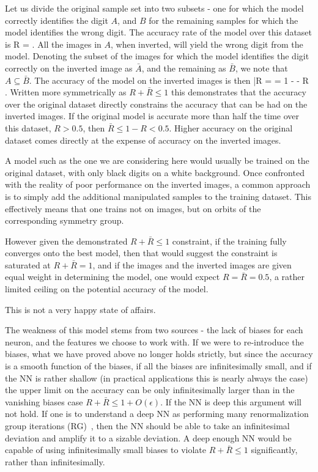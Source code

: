 \documentclass[onecolumn, nofootinbib, aps, pra, 11pt]{revtex4-1}
\begin{document}
Let us divide the original sample set into two subsets - one for which the model correctly identifies the digit $A$, and $B$ for the remaining samples for which the model identifies the wrong digit. The accuracy rate of the model over this dataset is 
\be
R = 
\; .
\ee
All the images in $A$, when inverted, will yield the wrong digit from the model. Denoting the subset of the images for which the model identifies the digit correctly on the inverted image as ${\bar A}$, and the remaining as ${\bar B}$, we note that $A \subseteq {\bar B}$. The accuracy of the model on the inverted images is then
\be
{\bar R} =  = 1 -   - R
\; .
\ee
Written more symmetrically as $R + {\bar R} \leq 1$ this demonstrates that the accuracy over the original dataset directly constrains the accuracy that can be had on the inverted images. If the original model is accurate more than half the time over this dataset, $R>0.5$, then ${\bar R} \leq 1 - R < 0.5$. Higher accuracy on the original dataset comes directly at the expense of accuracy on the inverted images.

A model such as the one we are considering here would usually be trained on the original dataset, with only black digits on a white background. Once confronted with the reality of poor performance on the inverted images, a common approach is to simply add the additional manipulated samples to the training dataset. This effectively means that one trains not on images, but on orbits of the corresponding symmetry group.

However given the demonstrated $R + {\bar R} \leq 1$ constraint, if the training fully converges onto the best model, then that would suggest 
the constraint is saturated at $R + {\bar R} = 1$, and if the images and the inverted images are given equal weight in determining the model, one would expect $R = {\bar R} = 0.5$, a rather limited ceiling on the potential accuracy of the model.

This is not a very happy state of affairs. 

The weakness of this model stems from two sources - the lack of biases for each neuron, and the features we choose to work with. If we were to re-introduce the biases, what we have proved above no longer holds strictly, but since the accuracy is a smooth function of the biases, if all the biases are infinitesimally small, and if the NN is rather shallow (in practical applications this is nearly always the case) the upper limit on the accuracy can be only infinitesimally larger than in the vanishing biases case $R + {\bar R} \leq 1 + O(\epsilon)$. If the NN is deep this argument will not hold. If one is to understand a deep NN as performing many renormalization group iterations (RG)~\citep{mehta2014exact}, then the NN should be able to take an infinitesimal deviation and amplify it to a sizable deviation. A deep enough NN would be capable of using infinitesimally small biases to violate $R + {\bar R} \leq 1$ significantly, rather than infinitesimally.
\end{document}

